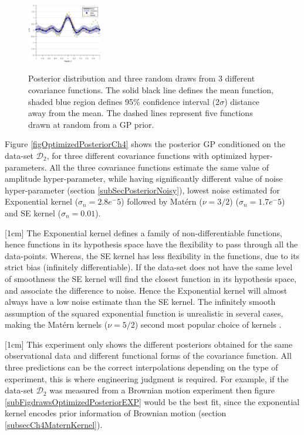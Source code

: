 \begin{figure}[!ht]
  {
        \includegraphics[width=0.29\textwidth]
        {images/part2/drawsPosteriorSE}
        \label{subFigdrawsPosteriorSE}
  }\quad
\caption{Posterior distribution and three random draws from 3 different covariance functions. The solid black line defines the mean function, shaded blue region defines 95\% confidence interval (2$\sigma$) distance away from the mean. The dashed lines represent five functions drawn at random from a GP prior. }
       \label{figpreOptimizedPosteriorCh5}
\end{figure}

\begin{mdframed}[hidealllines=true,backgroundcolor=lightgray!20]
Figure \ref{figOptimizedPosteriorCh4} shows the posterior GP conditioned on the data-set $\mathcal{D}_{2}$, for three different covariance functions with optimized hyper-parameters. All the three covariance functions estimate the same value of amplitude hyper-parameter, while having significantly different value of noise hyper-parameter (section \ref{subSecPosteriorNoisy}), lowest noise estimated for Exponential kernel ($\sigma_{n} = 2.8e^-5$) followed by Mat\'ern ($\nu=3/2$) ($\sigma_{n} = 1.7e^-5$) and SE kernel ($\sigma_{n} = 0.01$). 

[1cm]
The Exponential kernel defines a family of non-differentiable functions, hence functions in its hypothesis space have the flexibility to pass through all the data-points. Whereas, the SE kernel has less flexibility in the functions, due to its strict bias (infinitely differentiable). If the data-set does not have the same level of smoothness the SE kernel will find the closest function in its hypothesis space, and associate the difference to noise. Hence the Exponential kernel will almost always have a low noise estimate than the SE kernel. The infinitely smooth assumption of the squared exponential function is unrealistic in several cases, making the Mat\'ern kernels ($\nu=5/2$) second most popular choice of kernels \cite{Stein1999Springer, cornford2002modelling}. 

[1cm]
This experiment only shows the different posteriors obtained for the same observational data and different functional forms of the covariance function. All three predictions can be the correct interpolations depending on the type of experiment, this is where engineering judgment is required. For example, if the data-set $\mathcal{D}_{2}$ was measured from a Brownian motion experiment then figure \ref{subFigdrawsOptimizedPosteriorEXP} would be the best fit, since the exponential kernel encodes prior information of Brownian motion (section \ref{subsecCh4MaternKernel}).

\end{mdframed}

